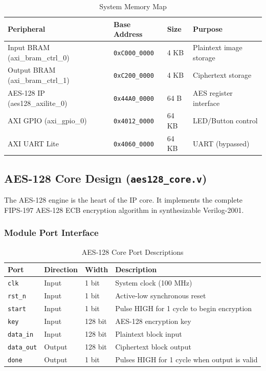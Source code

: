 \documentclass[12pt,a4paper]{article}
\begin{document}
\begin{table}[H]
\centering
\caption{System Memory Map}
\begin{tabular}{llll}
\toprule
\textbf{Peripheral} & \textbf{Base Address} & \textbf{Size} & \textbf{Purpose} \\
\midrule
Input BRAM (axi\_bram\_ctrl\_0)  & \texttt{0xC000\_0000} & 4 KB & Plaintext image storage \\
Output BRAM (axi\_bram\_ctrl\_1) & \texttt{0xC200\_0000} & 4 KB & Ciphertext storage \\
AES-128 IP (aes128\_axilite\_0)  & \texttt{0x44A0\_0000} & 64 B & AES register interface \\
AXI GPIO (axi\_gpio\_0)          & \texttt{0x4012\_0000} & 64 KB & LED/Button control \\
AXI UART Lite                    & \texttt{0x4060\_0000} & 64 KB & UART (bypassed) \\
\bottomrule
\end{tabular}
\end{table}

\subsection{AES-128 Core Design (\texttt{aes128\_core.v})}

The AES-128 engine is the heart of the IP core. It implements the complete FIPS-197 AES-128 ECB encryption algorithm in synthesizable Verilog-2001.

\subsubsection{Module Port Interface}

\begin{table}[H]
\centering
\caption{AES-128 Core Port Descriptions}
\begin{tabular}{llll}
\toprule
\textbf{Port} & \textbf{Direction} & \textbf{Width} & \textbf{Description} \\
\midrule
\texttt{clk}      & Input  & 1 bit  & System clock (100 MHz) \\
\texttt{rst\_n}   & Input  & 1 bit  & Active-low synchronous reset \\
\texttt{start}    & Input  & 1 bit  & Pulse HIGH for 1 cycle to begin encryption \\
\texttt{key}      & Input  & 128 bit & AES-128 encryption key \\
\texttt{data\_in} & Input  & 128 bit & Plaintext block input \\
\texttt{data\_out}& Output & 128 bit & Ciphertext block output \\
\texttt{done}     & Output & 1 bit  & Pulses HIGH for 1 cycle when output is valid \\
\bottomrule
\end{tabular}
\end{table}
\end{document}
